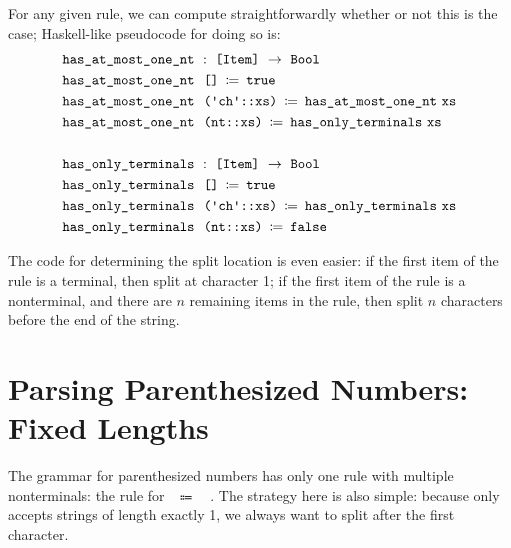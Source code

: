     For any given rule, we can compute straightforwardly whether or not this is the case; Haskell-like pseudocode for doing so is:
\begin{align*}
&\fname{has\_at\_most\_one\_nt}~\oftypesep~\typelist{\indname{Item}}~\to~\Bool \\
& \fname{has\_at\_most\_one\_nt}~~\nil\functiondefeq\true \\
& \fname{has\_at\_most\_one\_nt}~~\coqgroup{\cons{\terminal{\farg{ch}}}{\farg{xs}}}\functiondefeq \fname{has\_at\_most\_one\_nt}~\farg{xs} \\
& \fname{has\_at\_most\_one\_nt}~~\coqgroup{\cons{\nt{\farg{nt}}}{\farg{xs}}}\functiondefeq \fname{has\_only\_terminals}~\farg{xs} \\
\\
& \fname{has\_only\_terminals}~\oftypesep~\typelist{\indname{Item}}~\to~\Bool \\
& \fname{has\_only\_terminals}~~\nil\functiondefeq \true \\
& \fname{has\_only\_terminals}~~\coqgroup{\cons{\terminal{\farg{ch}}}{\farg{xs}}}\functiondefeq \fname{has\_only\_terminals}~\farg{xs} \\
& \fname{has\_only\_terminals}~~\coqgroup{\cons{\nt{\farg{nt}}}{\farg{xs}}}\functiondefeq \false
\end{align*}

  The code for determining the split location is even easier: if the first item of the rule is a terminal, then split at character 1; if the first item of the rule is a nonterminal, and there are $n$ remaining items in the rule, then split $n$ characters before the end of the string.

  \section{Parsing Parenthesized Numbers: Fixed Lengths}
    The grammar for parenthesized numbers has only one rule with multiple nonterminals: the rule for ~$\Coloneqq$~~.  The strategy here is also simple: because  only accepts strings of length exactly 1, we always want to split after the first character.

